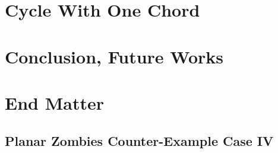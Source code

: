 \documentclass[letterpaper, 12pt]{report}
\theoremstyle{definition}
\begin{document}
\chapter{Cycle With One Chord \label{chapter q_m_n}}


\chapter{Conclusion, Future Works}


\newpage



\appendix


%

%

%

%

%

\chapter{End Matter}
%

\section{Planar Zombies Counter-Example Case IV}
%

\end{document}

